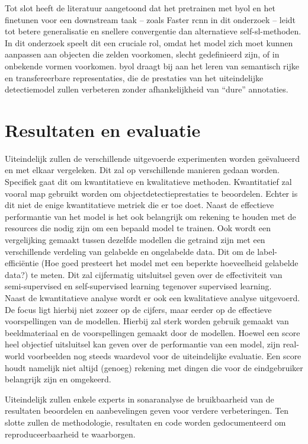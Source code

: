 Tot slot heeft de literatuur aangetoond dat het pretrainen met \gls{byol} en het finetunen voor een downstream taak -- zoals Faster \gls{rcnn} in dit onderzoek -- leidt tot betere generalisatie en snellere convergentie dan alternatieve \gls{self-sl}-methoden. In dit onderzoek speelt dit een cruciale rol, omdat het model zich moet kunnen aanpassen aan objecten die zelden voorkomen, slecht gedefinieerd zijn, of in onbekende vormen voorkomen. \gls{byol} draagt bij aan het leren van semantisch rijke en transfereerbare representaties, die de prestaties van het uiteindelijke detectiemodel zullen verbeteren zonder afhankelijkheid van ``dure'' annotaties.

\section{Resultaten en evaluatie}

Uiteindelijk zullen de verschillende uitgevoerde experimenten worden geëvalueerd en met elkaar vergeleken. Dit zal op verschillende manieren gedaan worden. Specifiek gaat dit om kwantitatieve en kwalitatieve methoden. Kwantitatief zal vooral \acrfull{map} gebruikt worden om objectdetectieprestaties te beoordelen. Echter is dit niet de enige kwantitatieve metriek die er toe doet. Naast de effectieve performantie van het model is het ook belangrijk om rekening te houden met de resources die nodig zijn om een bepaald model te trainen. Ook wordt een vergelijking gemaakt tussen dezelfde modellen die getraind zijn met een verschillende verdeling van gelabelde en ongelabelde data. Dit om de label-efficiëntie (Hoe goed presteert het model met een beperkte hoeveelheid gelabelde data?) te meten. Dit zal cijfermatig uitsluitsel geven over de effectiviteit van semi-supervised en self-supervised learning tegenover supervised learning. \\

Naast de kwantitatieve analyse wordt er ook een kwalitatieve analyse uitgevoerd. De focus ligt hierbij niet zozeer op de cijfers, maar eerder op de effectieve voorspellingen van de modellen. Hierbij zal sterk worden gebruik gemaakt van beeldmateriaal en de voorspellingen gemaakt door de modellen. Hoewel een score heel objectief uitsluitsel kan geven over de performantie van een model, zijn real-world voorbeelden nog steeds waardevol voor de uiteindelijke evaluatie. Een score houdt namelijk niet altijd (genoeg) rekening met dingen die voor de eindgebruiker belangrijk zijn en omgekeerd.

Uiteindelijk zullen enkele experts in sonaranalyse de bruikbaarheid van de resultaten beoordelen en aanbevelingen geven voor verdere verbeteringen. Ten slotte zullen de methodologie, resultaten en code worden gedocumenteerd om reproduceerbaarheid te waarborgen.